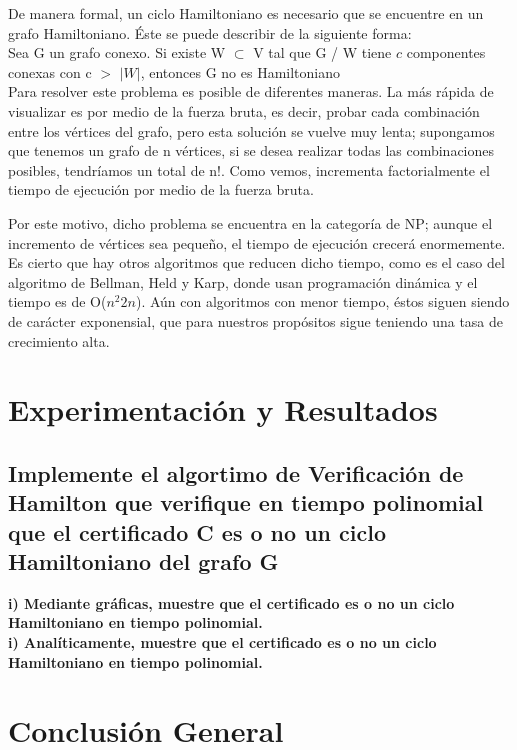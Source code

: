 \documentclass[spanish]{article}
\begin{document}
	De manera formal, un ciclo Hamiltoniano es necesario que se encuentre en un grafo Hamiltoniano. Éste se puede describir de la siguiente forma:\\
	
	Sea G un grafo conexo. Si existe W $\subset$  V tal que G / W tiene $c$ componentes conexas con c $>$ $|W|$, entonces G no es Hamiltoniano\\

	Para resolver este problema es posible de diferentes maneras. La más rápida de visualizar es por medio de la fuerza bruta, es decir, probar cada combinación entre los vértices del grafo, pero esta solución se vuelve muy lenta; supongamos que tenemos un grafo de n vértices, si se desea realizar todas las combinaciones posibles, tendríamos un total de n!. Como vemos, incrementa factorialmente el tiempo de ejecución por medio de la fuerza bruta. \\	
	
	\newpage	

	Por este motivo, dicho problema se encuentra en la categoría de NP; aunque el incremento de vértices sea pequeño, el tiempo de ejecución crecerá enormemente. Es cierto que hay otros algoritmos que reducen  dicho tiempo, como es el caso del algoritmo de Bellman, Held y Karp, donde usan programación dinámica y el tiempo es de O($n^2$$2n$). Aún con algoritmos con menor tiempo, éstos siguen siendo de carácter exponensial, que para nuestros propósitos sigue teniendo una tasa de crecimiento alta.

	\section{Experimentaci\'on y Resultados}
		
	\subsection{Implemente el algortimo de Verificación de Hamilton que verifique en tiempo polinomial que el certificado C  es o no un ciclo Hamiltoniano del grafo G}

	{\large{ {\bf i) Mediante gráficas, muestre que el certificado es o no un ciclo Hamiltoniano en tiempo polinomial.}}}\\

	{\large{ {\bf i) Analíticamente, muestre que el certificado es o no un ciclo Hamiltoniano en tiempo polinomial.}}}\\
	
	\section{Conclusi\'on General}
\end{document}
